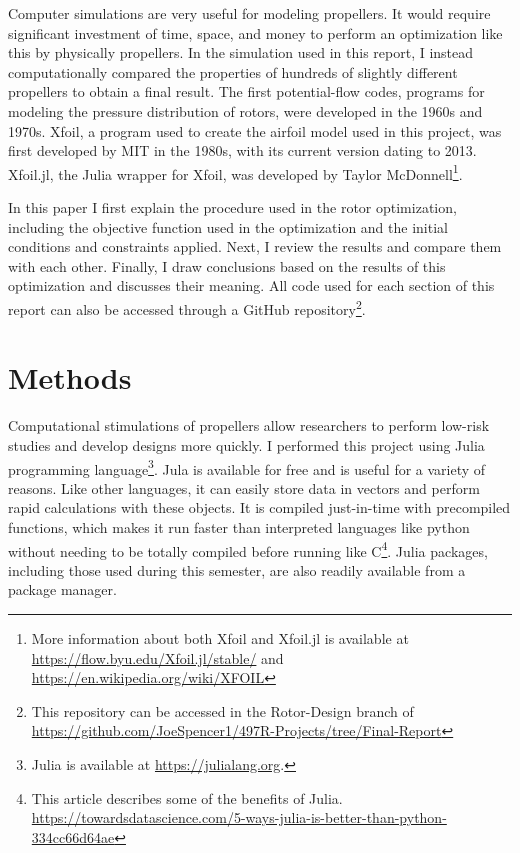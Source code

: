 \documentclass[journal ]{new-aiaa}
\begin{document}
Computer simulations are very useful for modeling propellers. It would require significant investment of time, space, and money to perform an optimization like this by physically propellers. In the simulation used in this report, I instead computationally compared the properties of hundreds of slightly different propellers to obtain a final result. The first potential-flow codes, programs for modeling the pressure distribution of rotors, were developed in the 1960s and 1970s. Xfoil, a program used to create the airfoil model used in this project, was first developed by MIT in the 1980s, with its current version dating to 2013. Xfoil.jl, the Julia wrapper for Xfoil, was developed by Taylor McDonnell\footnote{More information about both Xfoil and Xfoil.jl is available at \url{https://flow.byu.edu/Xfoil.jl/stable/} and \url{https://en.wikipedia.org/wiki/XFOIL}}.

In this paper I first explain the procedure used in the rotor optimization, including the objective function used in the optimization and the initial conditions and constraints applied. Next, I review the results and compare them with each other. Finally, I draw conclusions based on the results of this optimization and discusses their meaning. All code used for each section of this report can also be accessed through a GitHub repository\footnote{This repository can be accessed in the Rotor-Design branch of \url{https://github.com/JoeSpencer1/497R-Projects/tree/Final-Report}}.


\section{Methods}

Computational stimulations of propellers allow researchers to perform low-risk studies and develop designs more quickly. I performed this project using Julia programming language\footnote{Julia is available at \url{https://julialang.org}.}. Jula is available for free and is useful for a variety of reasons. Like other languages, it can easily store data in vectors and perform rapid calculations with these objects. It is compiled just-in-time with precompiled functions, which makes it run faster than interpreted languages like python without needing to be totally compiled before running like C\footnote{This article describes some of the benefits of Julia. \url{https://towardsdatascience.com/5-ways-julia-is-better-than-python-334cc66d64ae}}. Julia  packages, including those used during this semester, are also readily available from a package manager.
\end{document}
